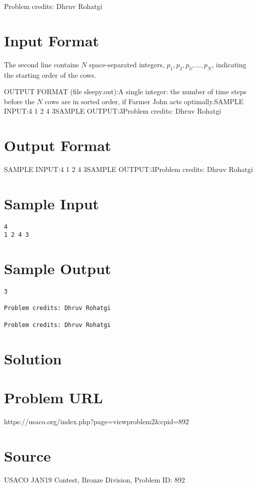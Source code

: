 \documentclass[12pt]{article}
\begin{document}
Problem credits: Dhruv Rohatgi



\section*{Input Format}
The second line contains $N$ space-separated integers, 
$p_1, p_2, p_3, \dots, p_N$, indicating the starting order of the cows.

OUTPUT FORMAT (file sleepy.out):A single integer: the number of time steps before the $N$ cows are in sorted
order, if Farmer John acts optimally.SAMPLE INPUT:4
1 2 4 3SAMPLE OUTPUT:3Problem credits: Dhruv Rohatgi

\section*{Output Format}
SAMPLE INPUT:4
1 2 4 3SAMPLE OUTPUT:3Problem credits: Dhruv Rohatgi

\section*{Sample Input}
\begin{verbatim}
4
1 2 4 3
\end{verbatim}

\section*{Sample Output}
\begin{verbatim}
3

Problem credits: Dhruv Rohatgi

Problem credits: Dhruv Rohatgi
\end{verbatim}

\section*{Solution}


\section*{Problem URL}
https://usaco.org/index.php?page=viewproblem2&cpid=892

\section*{Source}
USACO JAN19 Contest, Bronze Division, Problem ID: 892
\end{document}
